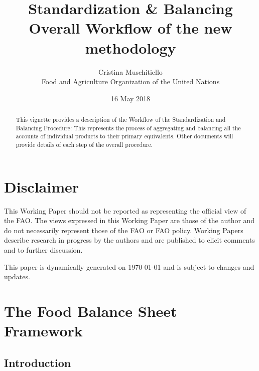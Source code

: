 \documentclass[]{article}
\title{Standardization \& Balancing\\
Overall Workflow of the new methodology}
\author{Cristina Muschitiello\\
Food and Agriculture Organization of the United Nations}
\date{16 May 2018}
\begin{document}
\maketitle
\begin{abstract}
This vignette provides a description of the Workflow of the
Standardization and Balancing Procedure: This represents the process of
aggregating and balancing all the accounts of individual products to
their primary equivalents. Other documents will provide details of each
step of the overall procedure.
\end{abstract}

{
\setcounter{tocdepth}{4}
\tableofcontents
}
\section*{Disclaimer}\label{disclaimer}

This Working Paper should not be reported as representing the official
view of the FAO. The views expressed in this Working Paper are those of
the author and do not necessarily represent those of the FAO or FAO
policy. Working Papers describe research in progress by the authors and
are published to elicit comments and to further discussion.

This paper is dynamically generated on \today{} and is subject to
changes and updates.

\newpage

\section{The Food Balance Sheet
Framework}\label{the-food-balance-sheet-framework}

\subsection{Introduction}\label{introduction}
\end{document}
